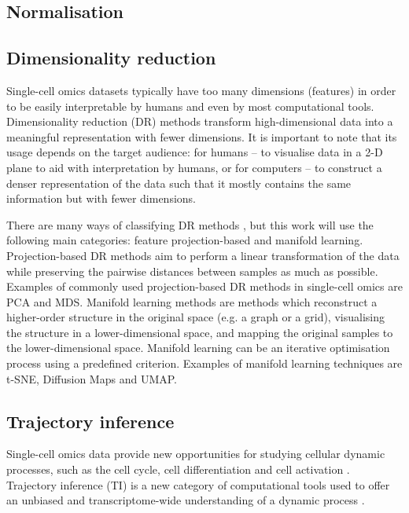 
\subsection{Normalisation}

\subsection{Dimensionality reduction}
Single-cell omics datasets typically have too many dimensions (features) in order to be easily interpretable by humans and even by most computational tools. 
Dimensionality reduction (DR) methods transform high-dimensional data into a meaningful representation with fewer dimensions. It is important to note that its usage depends on the target audience: for humans -- to visualise data in a 2-D plane to aid with interpretation by humans, or for computers -- to construct a denser representation of the data such that it mostly contains the same information but with fewer dimensions.

There are many ways of classifying DR methods \cite{engel_surveydimensionreduction_2012}, but this work will use the following main categories: feature projection-based and manifold learning. 
Projection-based DR methods aim to perform a linear transformation of the data while preserving the pairwise distances between samples as much as possible. Examples of commonly used projection-based DR methods in single-cell omics are PCA and MDS. 
Manifold learning methods are methods which reconstruct a higher-order structure in the original space (e.g. a graph or a grid), visualising the structure in a lower-dimensional space, and mapping the original samples to the lower-dimensional space. Manifold learning can be an iterative optimisation process using a predefined criterion. Examples of manifold learning techniques are t-SNE, Diffusion Maps and UMAP. 


\subsection{Trajectory inference}
Single-cell omics data provide new opportunities for studying cellular dynamic processes, such as the cell cycle, cell differentiation and cell activation \cite{tanay_scalingsinglecellgenomics_2017,etzrodt_quantitativesinglecellapproaches_2014}. 
Trajectory inference (TI) is a new category of computational tools used to offer an unbiased and transcriptome-wide understanding of a dynamic process \cite{tanay_scalingsinglecellgenomics_2017,cannoodt_computationalmethodstrajectory_2016}. 


